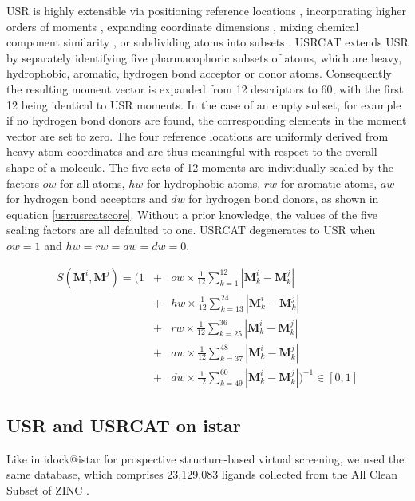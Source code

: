 USR \citep{1379} is highly extensible via positioning reference locations \citep{1334,1335}, incorporating higher orders of moments \citep{1333,1337}, expanding coordinate dimensions \citep{1337,1338}, mixing chemical component similarity \citep{1333,1407,1408}, or subdividing atoms into subsets \citep{1436,1331}. USRCAT \citep{1331} extends USR \citep{1379} by separately identifying five pharmacophoric subsets of atoms, which are heavy, hydrophobic, aromatic, hydrogen bond acceptor or donor atoms. Consequently the resulting moment vector is expanded from 12 descriptors to 60, with the first 12 being identical to USR moments. In the case of an empty subset, for example if no hydrogen bond donors are found, the corresponding elements in the moment vector are set to zero. The four reference locations are uniformly derived from heavy atom coordinates and are thus meaningful with respect to the overall shape of a molecule. The five sets of 12 moments are individually scaled by the factors $ow$ for all atoms, $hw$ for hydrophobic atoms, $rw$ for aromatic atoms, $aw$ for hydrogen bond acceptors and $dw$ for hydrogen bond donors, as shown in equation \eqref{usr:usrcatscore}. Without a prior knowledge, the values of the five scaling factors are all defaulted to one. USRCAT degenerates to USR when $ow=1$ and $hw=rw=aw=dw=0$.

\begin{eqnarray}
S(\mathbf M^i, \mathbf M^j)=(1
&+&ow\times\frac{1}{12}\sum_{k= 1}^{12}|\mathbf M_k^i-\mathbf M_k^j|\nonumber\\
&+&hw\times\frac{1}{12}\sum_{k=13}^{24}|\mathbf M_k^i-\mathbf M_k^j|\nonumber\\
&+&rw\times\frac{1}{12}\sum_{k=25}^{36}|\mathbf M_k^i-\mathbf M_k^j|\nonumber\\
&+&aw\times\frac{1}{12}\sum_{k=37}^{48}|\mathbf M_k^i-\mathbf M_k^j|\nonumber\\
&+&dw\times\frac{1}{12}\sum_{k=49}^{60}|\mathbf M_k^i-\mathbf M_k^j|)^{-1}\in[0, 1]
\label{usr:usrcatscore}
\end{eqnarray}

\subsection{USR and USRCAT on istar}

Like in idock@istar for prospective structure-based virtual screening, we used the same database, which comprises 23,129,083 ligands collected from the All Clean Subset of ZINC \citep{532,1178}.


